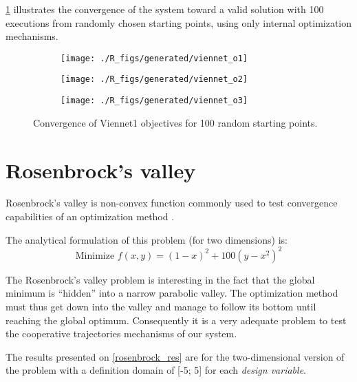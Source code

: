 \figurename{} \ref{viennet_res} illustrates the convergence of the system toward a valid solution with 100 executions from randomly chosen starting points, using only internal optimization mechanisms.

\begin{figure}[h]

	\begin{subfigure}[b]{0.32\textwidth}
		\centering
		\texttt{[image: ./R\_figs/generated/viennet\_o1]}	
	\end{subfigure}
	\hfill%
	\begin{subfigure}[b]{0.32\textwidth}
		\centering
		\texttt{[image: ./R\_figs/generated/viennet\_o2]}	
	\end{subfigure}
	\hfill%
	\begin{subfigure}[b]{0.32\textwidth}
		\centering
		\texttt{[image: ./R\_figs/generated/viennet\_o3]}	
	\end{subfigure}
	\caption{Convergence of Viennet1 objectives for 100 random starting points.}
	\label{viennet_res}
\end{figure}

\section{Rosenbrock's valley}

Rosenbrock's valley is non-convex function commonly used to test convergence capabilities of an optimization method \cite{Rosenbrock01011960}.

The analytical formulation of this problem (for two dimensions) is:
$$\text{Minimize } f(x,y) = (1-x)^2 + 100(y - x^2)^2$$

The Rosenbrock's valley problem is interesting in the fact that the global minimum is \enquote{hidden} into a narrow parabolic valley. The optimization method must thus get down into the valley and manage to follow its bottom until reaching the global optimum. Consequently it is a very adequate problem to test the cooperative trajectories mechanisms of our system.

The results presented on \figurename{} \ref{rosenbrock_res} are for the two-dimensional version of the problem with a definition domain of [-5; 5] for each \emph{design variable}.

